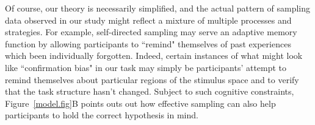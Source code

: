 \documentclass[3p,twocolumn,authoryear,10pt]{elsarticle}
\begin{document}
Of course, our theory is necessarily simplified, and the actual pattern of sampling data observed in our study might reflect 
a mixture of multiple processes and strategies. For example, self-directed sampling may serve an adaptive memory function by allowing participants to ``remind" themselves of past experiences which been individually forgotten.  Indeed, certain instances of what might look like ``confirmation bias" in our task may simply be participants' attempt to remind themselves about particular regions of the stimulus space and to verify that the task structure hasn't changed.  Subject to such cognitive constraints, Figure~\ref{model.fig}B points outs out how effective sampling can also help participants to hold the correct hypothesis in mind.


\end{document}
